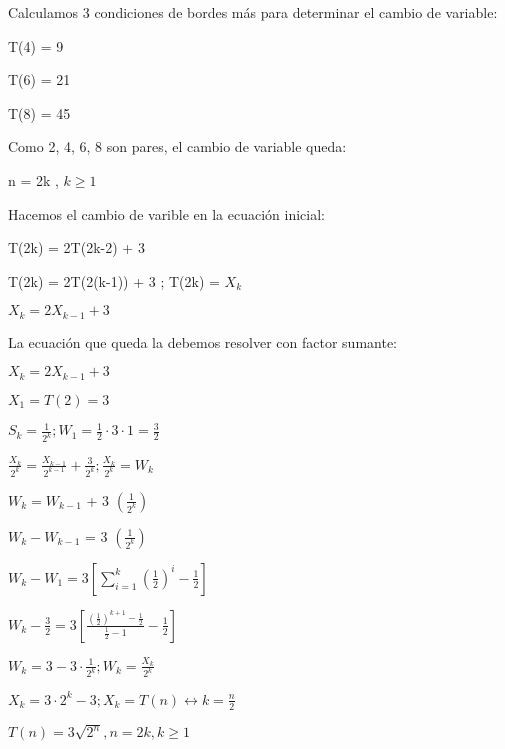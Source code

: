 \begin{solution}
  Calculamos 3 condiciones de bordes más para determinar el cambio de variable:
  \begin{center}
      T(4) = 9
      
      T(6) = 21
      
      T(8) = 45
  \end{center}
  
  Como 2, 4, 6, 8 son pares, el cambio de variable queda:
  \begin{center}
      n = 2k , $k \geq 1$
  \end{center}
  
  Hacemos el cambio de varible en la ecuación inicial:
  \begin{center}
      T(2k) = 2T(2k-2) + 3
      
      T(2k) = 2T(2(k-1)) + 3 ; T(2k) = $X_k$
      
      $X_k = 2X_{k-1} + 3$
  \end{center}
  
  La ecuación que queda la debemos resolver con factor sumante:
  \begin{center}
      $X_k = 2X_{k-1} + 3$
      
      $X_1 = T(2) = 3$
      
      $S_k = \frac{1}{2^k} ; W_1 = \frac{1}{2} \cdot 3 \cdot 1 = \frac{3}{2}$
      
      $\frac{X_k}{2^k} = \frac{X_{k-1}}{2^{k-1}} + \frac{3}{2^k} ; \frac{X_k}{2^k} = W_k$
      
      $W_k = W_{k-1}$ + 3 $\left( \frac{1}{2^k} \right)$
      
      $W_k - W_{k-1}$ = 3 $\left( \frac{1}{2^k} \right)$
      
      $W_k - W_1 = 3 [ \displaystyle\sum_{i=1}^{k} (\frac{1}{2})^i - \frac{1}{2} ]$
      
      $W_k - \frac{3}{2} = 3 [ \frac{(\frac{1}{2})^{k+1} - \frac{1}{2}}{\frac{1}{2}-1} - \frac{1}{2} ]$
      
      $W_k = 3 - 3 \cdot \frac{1}{2^k} ; W_k = \frac{X_k}{2^k}$
      
      $X_k = 3 \cdot 2^k - 3 ; X_k = T(n) \longleftrightarrow k = \frac{n}{2}$
      
      $T(n) = 3 \sqrt{2^n} , n = 2k , k \geq 1$
  \end{center}
\end{solution}
